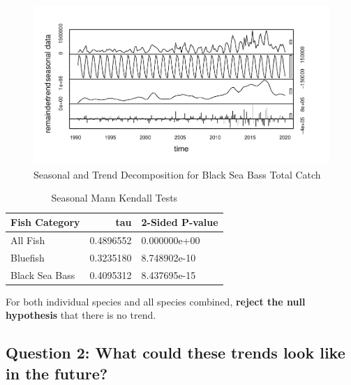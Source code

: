 \documentclass[
  12pt,
]{article}
\begin{document}
\begin{figure}[H]

\hfill{}\includegraphics{Report_FishTrends_files/figure-latex/Black Sea Bass Trends-1} 

\caption{Seasonal and Trend Decomposition for Black Sea Bass Total Catch}\label{fig:Black Sea Bass Trends}
\end{figure}

\begin{table}[H]

\caption{\label{tab:table4}Seasonal Mann Kendall Tests}
\centering
\begin{tabular}[t]{l|r|l}
\hline
Fish Category & tau & 2-Sided P-value\\
\hline
All Fish & 0.4896552 & 0.000000e+00\\
\hline
Bluefish & 0.3235180 & 8.748902e-10\\
\hline
Black Sea Bass & 0.4095312 & 8.437695e-15\\
\hline
\end{tabular}
\end{table}

For both individual species and all species combined, \textbf{reject the
null hypothesis} that there is no trend.

\hypertarget{question-2-what-could-these-trends-look-like-in-the-future}{%
\subsection{Question 2: What could these trends look like in the
future?}\label{question-2-what-could-these-trends-look-like-in-the-future}}
\end{document}
